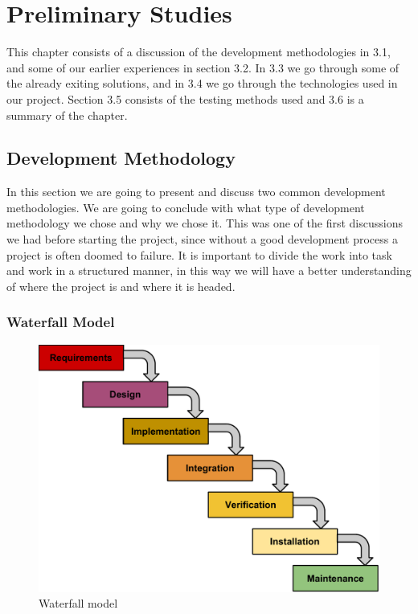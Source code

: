\chapter{Preliminary Studies}
\label{Preliminary Studies}

This chapter consists of a discussion of the development methodologies in 3.1, and some of our earlier experiences in section 3.2.
In 3.3 we go through some of the already exiting solutions, and in 3.4 we go through the technologies used in our project.
Section 3.5 consists of the testing methods used and 3.6 is a summary of the chapter.



\section{Development Methodology}

In this section we are going to present and discuss two common development methodologies.
We are going to conclude with what type of development methodology we chose and why we chose it.
This was one of the first discussions we had before starting the project, since without a good development process a project is often doomed to failure.
It is important to divide the work into task and work in a structured manner, in this way we will have a better understanding of where the project is and where it is headed.

\subsection{Waterfall Model}

\begin{figure}[h]
\begin{center}
\includegraphics[scale=0.6]{../Figures/Waterfall-model.pdf}
\end{center}
\caption{Waterfall model}
\label{figure:waterfall-model}
\end{figure}

